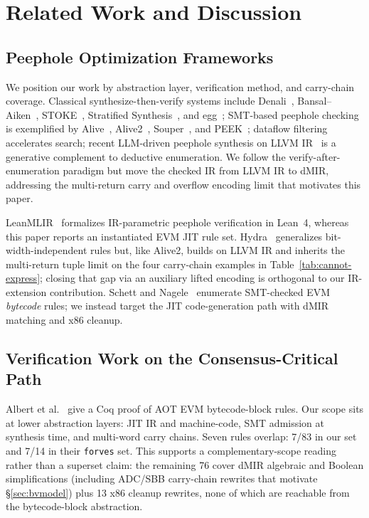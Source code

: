 \section{Related Work and Discussion}
\label{sec:related}

\subsection{Peephole Optimization Frameworks}

{\sloppy
We position our work by abstraction layer, verification method, and
carry-chain coverage. Classical synthesize-then-verify systems include
Denali~\cite{denali_pldi02}, Bansal--Aiken~\cite{bansal_aiken_asplos06},
STOKE~\cite{stoke}, Stratified Synthesis~\cite{stratified}, and
egg~\cite{egg}; SMT-based peephole checking is exemplified by
Alive~\cite{alive}, Alive2~\cite{alive2}, Souper~\cite{souper}, and
PEEK~\cite{peek}; dataflow filtering~\cite{dataflow_pruning} accelerates
search; recent LLM-driven peephole synthesis on LLVM
IR~\cite{lampo2025} is a generative complement to deductive enumeration.
We follow the verify-after-enumeration paradigm but move the checked IR
from LLVM IR to dMIR, addressing the multi-return carry and overflow
encoding limit that motivates this paper.\par}

{\sloppy
LeanMLIR~\cite{leanmlir} formalizes IR-parametric peephole verification
in Lean~4, whereas this paper reports an instantiated EVM JIT rule set.
Hydra~\cite{hydra} generalizes bit-width-independent rules but, like
Alive2, builds on LLVM IR and inherits the multi-return tuple limit on
the four carry-chain examples in Table~\ref{tab:cannot-express}; closing
that gap via an auxiliary lifted encoding is orthogonal to our IR-extension
contribution. Schett and Nagele~\cite{fmbc20_evm_peephole} enumerate
SMT-checked EVM \emph{bytecode} rules; we instead target the JIT
code-generation path with dMIR matching and x86 cleanup.\par}

\subsection{Verification Work on the Consensus-Critical Path}

Albert et al.~\cite{verified_evm_cav23} give a Coq proof of AOT EVM
bytecode-block rules. Our scope sits at lower abstraction layers: JIT IR
and machine-code, SMT admission at synthesis time, and multi-word carry
chains. Seven rules overlap: 7/83 in our set and 7/14 in their
\texttt{forves} set. This supports a complementary-scope reading rather
than a superset claim: the remaining 76 cover dMIR algebraic and Boolean
simplifications (including ADC/SBB carry-chain rewrites that motivate
\S\ref{sec:bvmodel}) plus 13 x86 cleanup rewrites, none of which are
reachable from the bytecode-block abstraction.


